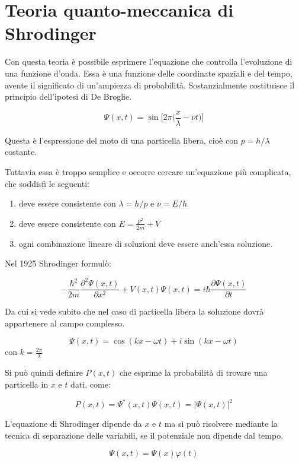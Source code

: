 
\section{Teoria quanto-meccanica di Shrodinger}

Con questa teoria è possibile esprimere l'equazione che controlla l'evoluzione di una funzione d'onda.
Essa è una funzione delle coordinate spaziali e del tempo, avente il significato di un'ampiezza di probabilità.
Sostanzialmente costituisce il principio dell'ipotesi di De Broglie.

$$ \Psi(x,t) = \sin \biggl[ 2 \pi \biggl( \frac{x}{\lambda} - \nu t \biggr) \biggr] $$

Questa è l'espressione del moto di una particella libera, cioè con $p=h/\lambda $ costante.

Tuttavia essa è troppo semplice e occorre cercare un'equazione più complicata, che soddisfi le seguenti:

\begin{enumerate}
\item deve essere consistente con $\lambda = h / p$ e $\nu = E / h$
\item deve essere consistente con $E = \frac{p^2}{2m} + V$
\item ogni combinazione lineare di soluzioni deve essere anch'essa soluzione.
\end{enumerate}

Nel 1925 Shrodinger formulò:

$$ -\frac{\hbar^2}{2m} \frac{\partial^2 \Psi(x,t)}{\partial x^2} + V(x,t) \Psi(x,t) = i \hbar \frac{\partial \Psi(x,t)}{\partial t} $$

Da cui si vede subito che nel caso di particella libera la soluzione dovrà appartenere al campo complesso.

$$ \Psi (x,t) = \cos(kx-\omega t) + i \sin(kx - \omega t) $$
con $k = \frac{2\pi}{\lambda}$

Si può quindi definire $P(x,t)$ che esprime la probabilità di trovare una particella in $x$ e $t$ dati, come:

$$ P(x,t) = \Psi^{\ast}(x,t)\Psi(x,t) = |\Psi(x,t)|^2 $$

L'equazione di Shrodinger dipende da $x$ e $t$ ma si può risolvere mediante la tecnica di separazione delle variabili, se il potenziale non dipende dal tempo.

$$ \Psi(x,t) = \Psi(x)\varphi(t) $$

